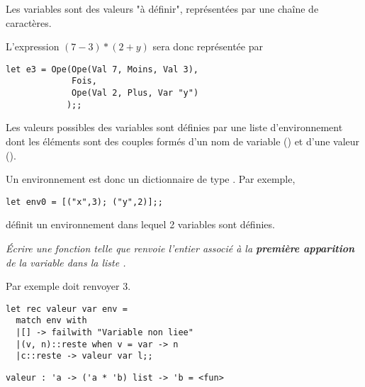 Les variables sont des valeurs "à définir", représentées par une chaîne de caractères.

L'expression $(7-3)*(2+y)$ sera donc représentée par
\begin{lstlisting}
let e3 = Ope(Ope(Val 7, Moins, Val 3), 
             Fois, 
             Ope(Val 2, Plus, Var "y")
            );;
\end{lstlisting}

Les valeurs possibles des variables sont définies par une liste d'environnement dont les éléments sont des couples formés d'un nom de variable () et d'une valeur (). 

Un environnement est donc un dictionnaire de type .
Par exemple, 
\begin{lstlisting}
let env0 = [("x",3); ("y",2)];;
\end{lstlisting}
 définit un environnement dans lequel 2 variables sont définies.
\begin{Exercise}\it 
Écrire une fonction  telle que  renvoie l'entier associé à la {\bf première apparition} de la variable  dans la liste .
\end{Exercise}
Par exemple  doit renvoyer 3.
\begin{Answer}
\begin{lstlisting}
let rec valeur var env =
  match env with
  |[] -> failwith "Variable non liee"
  |(v, n)::reste when v = var -> n
  |c::reste -> valeur var l;;
\end{lstlisting} 
\end{Answer}
\begin{lstlisting}
valeur : 'a -> ('a * 'b) list -> 'b = <fun>
\end{lstlisting}
\medskip

